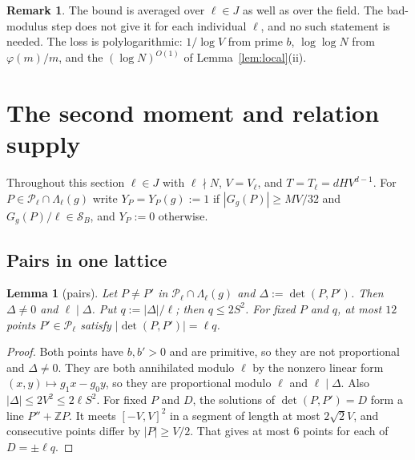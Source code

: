 \documentclass[11pt]{amsart}
\newtheorem{lemma}[theorem]{Lemma}
\theoremstyle{definition}
\newtheorem{remark}[theorem]{Remark}
\newcommand{\Z}{\mathbb{Z}}
\newcommand{\cP}{\mathcal{P}}
\newcommand{\cS}{\mathcal{S}}
\begin{document}
\begin{remark}
The bound is averaged over $\ell\in J$ as well as over the field. The bad-modulus step does not give it for each
individual $\ell$, and no such statement is needed. The loss is polylogarithmic: $1/\log V$ from prime $b$, $\log\log N$ from
$\varphi(m)/m$, and the $(\log N)^{O(1)}$ of Lemma~\ref{lem:local}(ii).
\end{remark}

\section{The second moment and relation supply}\label{sec:SM}

Throughout this section $\ell\in J$ with $\ell\nmid N$, $V=V_\ell$, and $T=T_\ell=dHV^{d-1}$. For $P\in\cP_\ell\cap\Lambda_\ell(g)$ write
$Y_P=Y_P(g):=1$ if $|G_g(P)|\ge MV/32$ and $G_g(P)/\ell\in\cS_B$, and $Y_P:=0$ otherwise.

\subsection{Pairs in one lattice}

\begin{lemma}[pairs]\label{lem:pairs}
Let $P\ne P'$ in $\cP_\ell\cap\Lambda_\ell(g)$ and $\Delta:=\det(P,P')$. Then $\Delta\ne0$ and $\ell\mid\Delta$. Put $q:=|\Delta|/\ell$; then $q\le2S^2$. For fixed $P$ and $q$, at most $12$ points $P'\in\cP_\ell$ satisfy
$|\det(P,P')|=\ell q$.
\end{lemma}

\begin{proof}
Both points have $b,b'>0$ and are primitive, so they are not proportional and $\Delta\ne0$. They are both annihilated
modulo $\ell$ by the nonzero linear form $(x,y)\mapsto g_1x-g_0y$, so they are proportional modulo $\ell$ and $\ell\mid\Delta$. Also
$|\Delta|\le2V^2\le2\ell S^2$. For fixed $P$ and $D$, the solutions of $\det(P,P')=D$ form a line $P''+\Z P$. It meets
$[-V,V]^2$ in a segment of length at most $2\sqrt2V$, and consecutive points differ by $|P|\ge V/2$. That gives at most $6$
points for each of $D=\pm\ell q$.
\end{proof}
\end{document}
